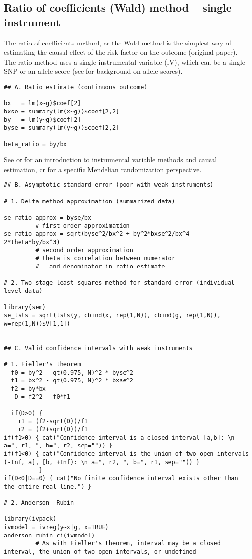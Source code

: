 \documentclass[a4paper,12pt]{article} %
\begin{document}
\subsection{Ratio of coefficients (Wald) method -- single instrument}
The ratio of coefficients method, or the Wald method is the simplest way of estimating the causal effect of the risk factor on the outcome (original paper). The ratio method uses a single instrumental variable (IV), which can be a single SNP or an allele score (see \cite{burgess2014score} for background on allele scores).

\begin{lstlisting}
## A. Ratio estimate (continuous outcome)

bx   = lm(x~g)$coef[2]
bxse = summary(lm(x~g))$coef[2,2]
by   = lm(y~g)$coef[2]
byse = summary(lm(y~g))$coef[2,2]

beta_ratio = by/bx
\end{lstlisting}

See \cite{greenland2000} or \cite{martens2006} for an introduction to instrumental variable methods and causal estimation, or \cite{lawlor2007} for a specific Mendelian randomization perspective.

\begin{lstlisting}
## B. Asymptotic standard error (poor with weak instruments)

# 1. Delta method approximation (summarized data)

se_ratio_approx = byse/bx
         # first order approximation
se_ratio_approx = sqrt(byse^2/bx^2 + by^2*bxse^2/bx^4 - 2*theta*by/bx^3)
         # second order approximation
         # theta is correlation between numerator
         #   and denominator in ratio estimate

# 2. Two-stage least squares method for standard error (individual-level data)

library(sem)
se_tsls = sqrt(tsls(y, cbind(x, rep(1,N)), cbind(g, rep(1,N)), w=rep(1,N))$V[1,1])


## C. Valid confidence intervals with weak instruments

# 1. Fieller's theorem
  f0 = by^2 - qt(0.975, N)^2 * byse^2
  f1 = bx^2 - qt(0.975, N)^2 * bxse^2
  f2 = by*bx
   D = f2^2 - f0*f1

  if(D>0) {
    r1 = (f2-sqrt(D))/f1
    r2 = (f2+sqrt(D))/f1
if(f1>0) { cat("Confidence interval is a closed interval [a,b]: \n a=", r1, ", b=", r2, sep="")) }
if(f1<0) { cat("Confidence interval is the union of two open intervals (-Inf, a], [b, +Inf): \n a=", r2, ", b=", r1, sep="")) }
          }
if(D<0|D==0) { cat("No finite confidence interval exists other than the entire real line.") }

# 2. Anderson--Rubin

library(ivpack)
ivmodel = ivreg(y~x|g, x=TRUE)
anderson.rubin.ci(ivmodel)
         # As with Fieller's theorem, interval may be a closed interval, the union of two open intervals, or undefined
\end{lstlisting}
\end{document}
